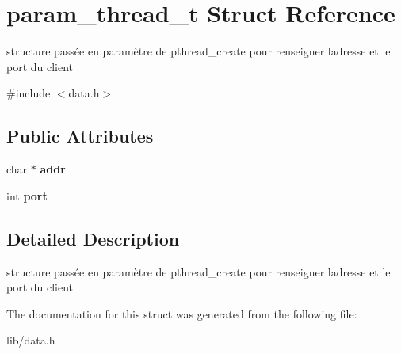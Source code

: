 \hypertarget{structparam__thread__t}{}\section{param\+\_\+thread\+\_\+t Struct Reference}
\label{structparam__thread__t}


structure passée en paramètre de pthread\+\_\+create pour renseigner l\textquotesingle{}adresse et le port du client  




{\ttfamily \#include $<$data.\+h$>$}

\subsection*{Public Attributes}
\begin{DoxyCompactItemize}
\item 
\mbox{\label{structparam__thread__t_a45723becec0dbc919f7ab283519c4574}} 
char $\ast$ {\bfseries addr}
\item 
\mbox{\label{structparam__thread__t_a8ab22e37d3e747017530f422be6f32ce}} 
int {\bfseries port}
\end{DoxyCompactItemize}


\subsection{Detailed Description}
structure passée en paramètre de pthread\+\_\+create pour renseigner l\textquotesingle{}adresse et le port du client 

The documentation for this struct was generated from the following file\+:\begin{DoxyCompactItemize}
\item 
lib/data.\+h\end{DoxyCompactItemize}
